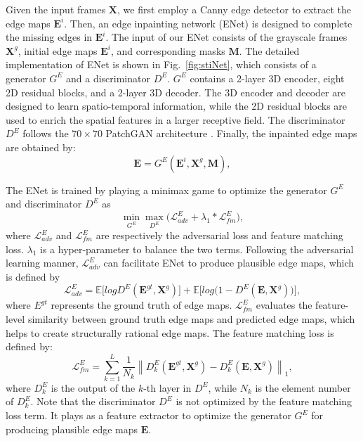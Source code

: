Given the input frames $\boldsymbol{X}$, we first employ a Canny edge detector to extract the edge maps $\boldsymbol{E}^{i}$. 
Then, an edge inpainting network (ENet) is designed to complete the missing edges in $\boldsymbol{E}^{i}$.
The input of our ENet consists of the grayscale frames $\boldsymbol{X}^{g}$, initial edge maps $\boldsymbol{E}^{i}$, and corresponding masks $\boldsymbol{M}$.
%
The detailed implementation of ENet is shown in Fig.~\ref{fig:stiNet}, which consists of a generator $G^E$ and a discriminator $D^E$.
$G^E$ contains a 2-layer 3D encoder, eight 2D residual blocks, and a 2-layer 3D decoder. 
The 3D encoder and decoder are designed to learn spatio-temporal information, while the 2D residual blocks are used to enrich the spatial features in a larger receptive field. The discriminator $D^E$ follows the $70\times 70$ PatchGAN architecture \cite{Isola_2017_CVPR}. 
Finally, the inpainted edge maps are obtained by:
\begin{equation}
\label{eq:edgenet}
\boldsymbol{E}=G^E(\boldsymbol{E}^{i},\boldsymbol{X}^{g},\boldsymbol{M}),
\end{equation}

The ENet is trained by playing a minimax game to optimize the generator $G^E$ and discriminator $D^E$ as
\begin{equation}
\label{eq:loss_e}
\min\limits_{G^E} \max \limits_{D^E} \big(\mathcal{L}^E_{adv}+\lambda_1 * \mathcal{L}^E_{fm}\big),
\end{equation}
where $\mathcal{L}^E_{adv}$ and $\mathcal{L}^E_{fm}$ are respectively the adversarial loss and feature matching loss. 
$\lambda_1$ is a hyper-parameter to balance the two terms.
%
Following the adversarial learning manner, $\mathcal{L}^E_{adv}$ can facilitate ENet to produce plausible edge maps, which is defined by
\begin{equation} \label{eq:edge_adver}
\mathcal{L}^E_{adv}  =\mathbb{E}\big[logD^E(\boldsymbol{E}^{gt},\boldsymbol{X}^{g})\big] +\mathbb{E} \big[log\big(1-D^E ( \boldsymbol{E},\boldsymbol{X}^{g})\big)\big],
\end{equation}
where $E^{gt}$ represents the ground truth of edge maps. $\mathcal{L}^E_{fm}$ evaluates the feature-level similarity between ground truth edge maps and predicted edge maps, which helps to create structurally rational edge maps. The feature matching loss is defined by:
\begin{equation}
\label{eq:edge_fm}
\mathcal{L}^E_{fm}=\sum_{k=1}^L{\frac{1}{N_k}\left\| D^E_k(\boldsymbol{E}^{gt},\boldsymbol{X}^{g})- D^E_k(\boldsymbol{E},\boldsymbol{X}^{g})\right\|_1},
\end{equation}
where $D^E_k$ is the output of the $k$-th layer in $D^E$, while $N_k$ is the element number of $D^E_k$. 
Note that the discriminator $D^E$ is not optimized by the feature matching loss term. It plays as a feature extractor to optimize the generator $G^E$ for producing plausible edge maps $\boldsymbol{E}$.




